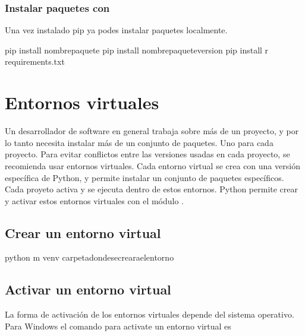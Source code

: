 \documentclass[a5paper,9pt,spanish]{sphinxmanual}
\begin{document}
\subsection{Instalar paquetes con }
\label{\detokenize{external-packages:instalar-paquetes-con-pip}}
\sphinxAtStartPar
Una vez instalado pip ya podes instalar paquetes localmente.

\begin{sphinxVerbatim}[commandchars=\\\{\}]
pip install \PYGZlt{}nombre\PYGZus{}paquete\PYGZgt{}
pip install \PYGZlt{}nombre\PYGZus{}paquete\PYGZgt{}\PYGZlt{}version\PYGZgt{}
pip install \PYGZhy{}r requirements.txt
\end{sphinxVerbatim}


\chapter{Entornos virtuales}
\label{\detokenize{external-packages:entornos-virtuales}}
\sphinxAtStartPar
Un desarrollador de software en general trabaja sobre más de un proyecto, y por lo tanto
necesita instalar más de un conjunto de paquetes. Uno para cada proyecto.
Para evitar conflictos entre las versiones usadas en cada proyecto, se recomienda usar
entornos virtuales.
Cada entorno virtual se crea con una versión específica de Python, y permite instalar
un conjunto de paquetes específicos.
Cada proyeto activa y se ejecuta dentro de estos entornos.
Python permite crear y activar estos entornos virtuales con el módulo .


\section{Crear un entorno virtual}
\label{\detokenize{external-packages:crear-un-entorno-virtual}}
\begin{sphinxVerbatim}[commandchars=\\\{\}]
python \PYGZhy{}m venv \PYGZlt{}carpeta\PYGZus{}donde\PYGZus{}se\PYGZus{}creara\PYGZus{}el\PYGZus{}entorno\PYGZgt{}
\end{sphinxVerbatim}


\section{Activar un entorno virtual}
\label{\detokenize{external-packages:activar-un-entorno-virtual}}
\sphinxAtStartPar
La forma de activación de los entornos virtuales depende del sistema operativo.
Para Windows el comando para activate un entorno virtual es
\end{document}
